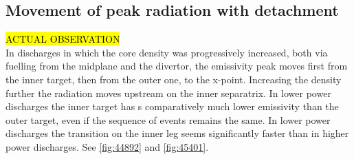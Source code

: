 \subsection{Movement of peak radiation with detachment}
\hl{ACTUAL OBSERVATION}\\
In discharges in which the core density was progressively increased, both via fuelling from the midplane and the divertor, the emissivity peak moves first from the inner target, then from the outer one, to the x-point. Increasing the density further the radiation moves upstream on the inner separatrix.
In lower power discharges the inner target has s comparatively much lower emissivity than the outer target, even if the sequence of events remains the same.
In lower power discharges the transition on the inner leg seems significantly faster than in higher power discharges.
See \autoref{fig:44892} and \autoref{fig:45401}.

